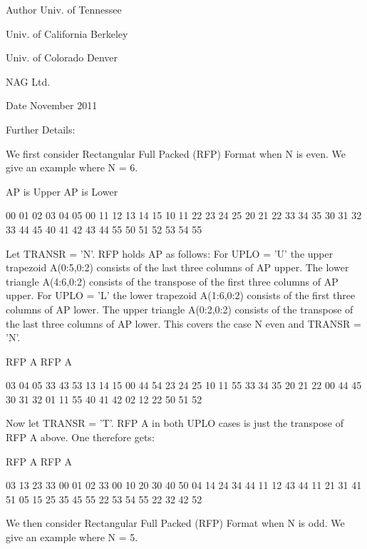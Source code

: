 \begin{DoxyAuthor}{Author}
Univ. of Tennessee 

Univ. of California Berkeley 

Univ. of Colorado Denver 

N\+A\+G Ltd. 
\end{DoxyAuthor}
\begin{DoxyDate}{Date}
November 2011 
\end{DoxyDate}
\begin{DoxyParagraph}{Further Details\+: }
\begin{DoxyVerb}  We first consider Rectangular Full Packed (RFP) Format when N is
  even. We give an example where N = 6.

      AP is Upper             AP is Lower

   00 01 02 03 04 05       00
      11 12 13 14 15       10 11
         22 23 24 25       20 21 22
            33 34 35       30 31 32 33
               44 45       40 41 42 43 44
                  55       50 51 52 53 54 55


  Let TRANSR = 'N'. RFP holds AP as follows:
  For UPLO = 'U' the upper trapezoid A(0:5,0:2) consists of the last
  three columns of AP upper. The lower triangle A(4:6,0:2) consists of
  the transpose of the first three columns of AP upper.
  For UPLO = 'L' the lower trapezoid A(1:6,0:2) consists of the first
  three columns of AP lower. The upper triangle A(0:2,0:2) consists of
  the transpose of the last three columns of AP lower.
  This covers the case N even and TRANSR = 'N'.

         RFP A                   RFP A

        03 04 05                33 43 53
        13 14 15                00 44 54
        23 24 25                10 11 55
        33 34 35                20 21 22
        00 44 45                30 31 32
        01 11 55                40 41 42
        02 12 22                50 51 52

  Now let TRANSR = 'T'. RFP A in both UPLO cases is just the
  transpose of RFP A above. One therefore gets:


           RFP A                   RFP A

     03 13 23 33 00 01 02    33 00 10 20 30 40 50
     04 14 24 34 44 11 12    43 44 11 21 31 41 51
     05 15 25 35 45 55 22    53 54 55 22 32 42 52


  We then consider Rectangular Full Packed (RFP) Format when N is
  odd. We give an example where N = 5.


\end{DoxyVerb}
\end{DoxyParagraph}
